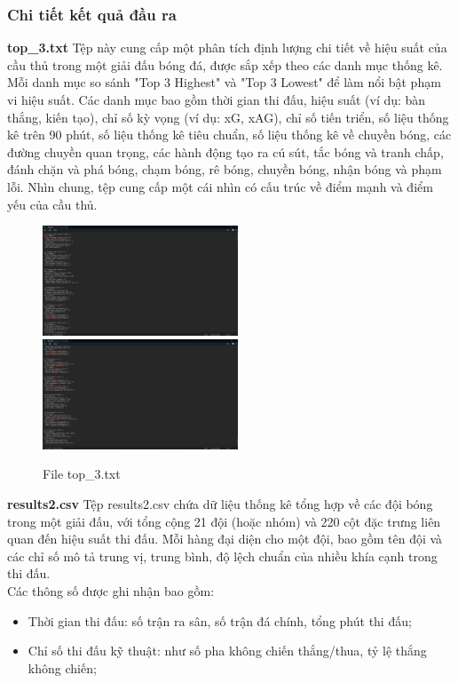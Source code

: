 \documentclass[12pt]{report}
\begin{document}
{\subsubsection{Chi tiết kết quả đầu ra}
\textbf{top\_3.txt}
Tệp này cung cấp một phân tích định lượng chi tiết về hiệu suất của cầu thủ trong một giải đấu bóng đá, được sắp xếp theo các danh mục thống kê. Mỗi danh mục so sánh "Top 3 Highest" và "Top 3 Lowest" để làm nổi bật phạm vi hiệu suất. Các danh mục bao gồm thời gian thi đấu, hiệu suất (ví dụ: bàn thắng, kiến tạo), chỉ số kỳ vọng (ví dụ: xG, xAG), chỉ số tiến triển, số liệu thống kê trên 90 phút, số liệu thống kê tiêu chuẩn, số liệu thống kê về chuyền bóng, các đường chuyền quan trọng, các hành động tạo ra cú sút, tắc bóng và tranh chấp, đánh chặn và phá bóng, chạm bóng, rê bóng, chuyền bóng, nhận bóng và phạm lỗi. Nhìn chung, tệp cung cấp một cái nhìn có cấu trúc về điểm mạnh và điểm yếu của cầu thủ.\\
\begin{figure}[h]
    \centering
    \includegraphics[width=220px]{top_3.png}
    \includegraphics[width=220px]{top_3_1.png}
    \caption{File top\_3.txt}
    \label{fig:top3}
\end{figure}
\textbf{results2.csv}
Tệp results2.csv chứa dữ liệu thống kê tổng hợp về các đội bóng trong một giải đấu, với tổng cộng 21 đội (hoặc nhóm) và 220 cột đặc trưng liên quan đến hiệu suất thi đấu. Mỗi hàng đại diện cho một đội, bao gồm tên đội và các chỉ số mô tả trung vị, trung bình, độ lệch chuẩn của nhiều khía cạnh trong thi đấu.\\
Các thông số được ghi nhận bao gồm:
\begin{itemize}
	\item Thời gian thi đấu: số trận ra sân, số trận đá chính, tổng phút thi đấu;
	\item Chỉ số thi đấu kỹ thuật: như số pha không chiến thắng/thua, tỷ lệ thắng không chiến;

\end{itemize}}
\end{document}
